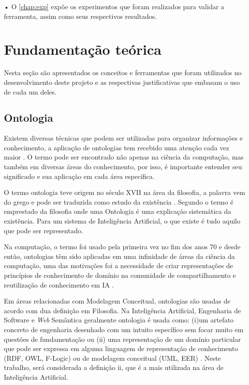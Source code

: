 \documentclass{bcc}
\begin{document}
• O \autoref{chap:exp} expõe os experimentos que foram realizados para validar a ferramenta, assim como seus respectivos resultados.


\chapter{Fundamentação teórica}
\label{chap:fundamentacao}

Nesta seção são apresentados os conceitos e ferramentas que foram utilizados no desenvolvimento deste projeto e as respectivas justificativas que embasam o uso de cada um deles.

\section{Ontologia}

Existem diversas técnicas que podem ser utilizadas para organizar informações e conhecimento, a aplicação de ontologias tem recebido uma atenção cada vez maior \cite{almeida2014}. O termo pode ser encontrado não apenas na ciência da computação, mas também em diversas áreas do conhecimento, por isso, é importante entender seu significado e sua aplicação em cada área específica.

O termo ontologia teve origem no século XVII na área da filosofia, a palavra vem do grego e pode ser traduzida como estudo da existência \cite{guizzardi2005}. Segundo \cite{gruber1995} o termo é emprestado da filosofia onde uma Ontologia é uma explicação sistemática da existência. Para um sistema de Inteligência Artificial, o que existe é tudo aquilo que pode ser representado.

Na computação, o termo foi usado pela primeira vez no fim dos anos 70 e desde então, ontologias têm sido aplicadas em uma infinidade de áreas da ciência da computação, uma das motivações foi a necessidade de criar representações de princípios de conhecimento de domínio na comunidade de compartilhamento e reutilização de conhecimento em IA \cite{guizzardi2005}.

Em áreas relacionadas com Modelagem Conceitual, ontologias são usadas de acordo com dua definição em Filosofia. Na Inteligência Artificial, Engenharia de Software e \textit{Web} Semântica geralmente ontologia é usada como: (i)um artefato concreto de engenharia desenhado com um intuito específico sem focar muito em questões de fundamentação ou (ii) uma representação de um domínio particular que pode ser expressa em alguma linguagem de representação de conhecimento (RDF, OWL, F-Logic) ou de modelagem conceitual (UML, EER) \cite{guizzardi2008}. Neste trabalho, será considerada a definição ii, que é a mais utilizada na área de Inteligência Artificial.
\end{document}
